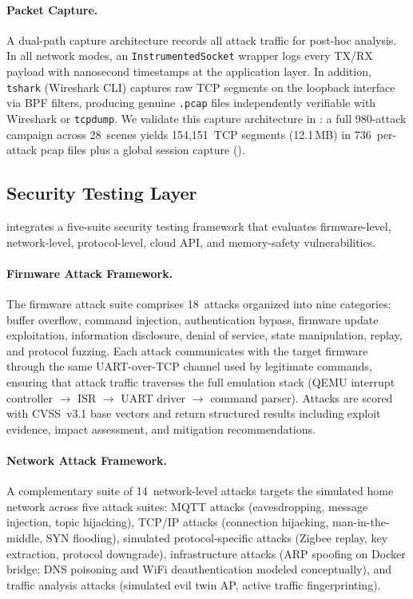 \paragraph{Packet Capture.}
A dual-path capture architecture records all attack traffic for
post-hoc analysis.  In all network modes, an
\texttt{InstrumentedSocket} wrapper logs every TX/RX payload with
nanosecond timestamps at the application layer.  In addition,
\texttt{tshark} (Wireshark CLI) captures raw TCP segments on the
loopback interface via BPF filters, producing genuine
\texttt{.pcap} files independently verifiable with Wireshark or
\texttt{tcpdump}.
We validate this capture architecture in
: a full 980-attack campaign across 28~scenes
yields 154{,}151~TCP segments (12.1\,MB) in
736~per-attack pcap files plus a global session capture
().

\subsection{Security Testing Layer}\label{sec:security-layer}

\sys{} integrates a five-suite security testing framework that
evaluates firmware-level, network-level, protocol-level, cloud API,
and memory-safety vulnerabilities.

\paragraph{Firmware Attack Framework.}
The firmware attack suite comprises 18~attacks organized into
nine categories: buffer overflow, command injection, authentication
bypass, firmware update exploitation, information disclosure,
denial of service, state manipulation, replay, and protocol fuzzing.
Each attack communicates with the target firmware through the same
UART-over-TCP channel used by legitimate commands, ensuring that
attack traffic traverses the full emulation stack (QEMU interrupt
controller $\to$ ISR $\to$ UART driver $\to$ command parser).
Attacks are scored with CVSS~v3.1 base vectors and return structured
results including exploit evidence, impact assessment, and mitigation
recommendations.

\paragraph{Network Attack Framework.}
A complementary suite of 14~network-level attacks targets the
simulated home network across five attack suites: MQTT attacks
(eavesdropping, message injection, topic hijacking), TCP/IP attacks
(connection hijacking, man-in-the-middle, SYN flooding),
simulated protocol-specific attacks (Zigbee replay, key extraction,
protocol downgrade), infrastructure attacks (ARP spoofing on Docker
bridge; DNS poisoning and WiFi deauthentication modeled
conceptually), and traffic analysis attacks (simulated evil twin AP,
active traffic fingerprinting).

